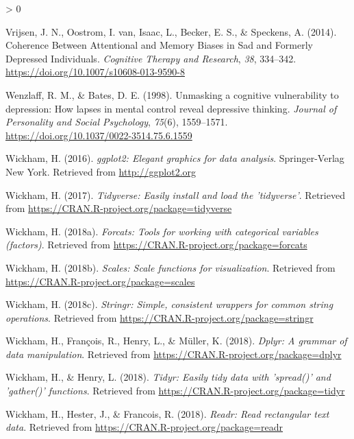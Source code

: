 \documentclass[
  english,
  man]{apa6}
\newlength{\cslhangindent}
\newenvironment{CSLReferences}[2] %
 {%
  \setlength{\parindent}{0pt}
  \ifodd #1 \everypar{\setlength{\hangindent}{\cslhangindent}}\ignorespaces\fi
  \ifnum #2 > 0
  \setlength{\parskip}{#2\baselineskip}
  \fi
 }%
 {}
\begin{document}
\begin{CSLReferences}{1}{0}
\leavevmode\hypertarget{ref-Vrijsen2014}{}%
Vrijsen, J. N., Oostrom, I. van, Isaac, L., Becker, E. S., \& Speckens, A. (2014). Coherence {Between} {Attentional} and {Memory} {Biases} in {Sad} and {Formerly} {Depressed} {Individuals}. \emph{Cognitive Therapy and Research}, \emph{38}, 334--342. \url{https://doi.org/10.1007/s10608-013-9590-8}

\leavevmode\hypertarget{ref-Wenzlaff1998}{}%
Wenzlaff, R. M., \& Bates, D. E. (1998). Unmasking a cognitive vulnerability to depression: How lapses in mental control reveal depressive thinking. \emph{Journal of Personality and Social Psychology}, \emph{75}(6), 1559--1571. \url{https://doi.org/10.1037/0022-3514.75.6.1559}

\leavevmode\hypertarget{ref-R-ggplot2}{}%
Wickham, H. (2016). \emph{ggplot2: Elegant graphics for data analysis}. Springer-Verlag New York. Retrieved from \url{http://ggplot2.org}

\leavevmode\hypertarget{ref-R-tidyverse}{}%
Wickham, H. (2017). \emph{Tidyverse: Easily install and load the 'tidyverse'}. Retrieved from \url{https://CRAN.R-project.org/package=tidyverse}

\leavevmode\hypertarget{ref-R-forcats}{}%
Wickham, H. (2018a). \emph{Forcats: Tools for working with categorical variables (factors)}. Retrieved from \url{https://CRAN.R-project.org/package=forcats}

\leavevmode\hypertarget{ref-R-scales}{}%
Wickham, H. (2018b). \emph{Scales: Scale functions for visualization}. Retrieved from \url{https://CRAN.R-project.org/package=scales}

\leavevmode\hypertarget{ref-R-stringr}{}%
Wickham, H. (2018c). \emph{Stringr: Simple, consistent wrappers for common string operations}. Retrieved from \url{https://CRAN.R-project.org/package=stringr}

\leavevmode\hypertarget{ref-R-dplyr}{}%
Wickham, H., François, R., Henry, L., \& Müller, K. (2018). \emph{Dplyr: A grammar of data manipulation}. Retrieved from \url{https://CRAN.R-project.org/package=dplyr}

\leavevmode\hypertarget{ref-R-tidyr}{}%
Wickham, H., \& Henry, L. (2018). \emph{Tidyr: Easily tidy data with 'spread()' and 'gather()' functions}. Retrieved from \url{https://CRAN.R-project.org/package=tidyr}

\leavevmode\hypertarget{ref-R-readr}{}%
Wickham, H., Hester, J., \& Francois, R. (2018). \emph{Readr: Read rectangular text data}. Retrieved from \url{https://CRAN.R-project.org/package=readr}


\end{CSLReferences}
\end{document}
